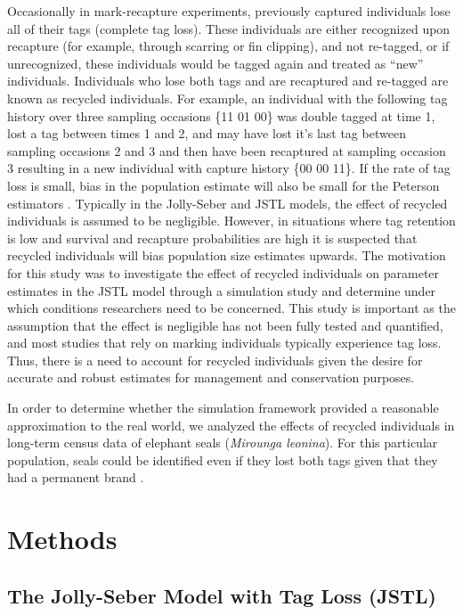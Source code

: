 \documentclass[12pt]{article}
\begin{document}
Occasionally in mark-recapture experiments, previously captured
individuals lose all of their tags (complete tag loss). These
individuals are either recognized upon recapture (for example, through
scarring or fin clipping), and not re-tagged, or if unrecognized, these
individuals would be tagged again and treated as ``new'' individuals.
Individuals who lose both tags and are recaptured and re-tagged are
known as recycled individuals. For example, an individual with the
following tag history over three sampling occasions \{11 01 00\} was
double tagged at time 1, lost a tag between times 1 and 2, and may have
lost it's last tag between sampling occasions 2 and 3 and then have been
recaptured at sampling occasion 3 resulting in a new individual with
capture history \{00 00 11\}. If the rate of tag loss is small, bias in
the population estimate will also be small for the Peterson estimators
\citep{Seber:1981}. Typically in the Jolly-Seber and JSTL models, the
effect of recycled individuals is assumed to be negligible. However, in
situations where tag retention is low and survival and recapture
probabilities are high it is suspected that recycled individuals will
bias population size estimates upwards. The motivation for this study
was to investigate the effect of recycled individuals on parameter
estimates in the JSTL model through a simulation study and determine
under which conditions researchers need to be concerned.  This study is important as the assumption that the effect is negligible has not been fully tested and quantified, and most studies that rely on marking individuals typically experience tag loss. Thus, there is a need to account for recycled individuals given the desire for accurate and robust estimates for management and conservation purposes.

In order to determine whether the simulation framework provided a
reasonable approximation to the real world, we analyzed the effects of
recycled individuals in long-term census data of elephant seals (\textit{Mirounga leonina}). For
this particular population, seals could be identified even if they lost
both tags given that they had a permanent brand \citep{McMahonWhite:2009}.

\section{Methods}\label{methods}

\subsection{The Jolly-Seber Model with Tag Loss
(JSTL)}\label{the-jolly-seber-model-with-tag-loss-jstl}
\end{document}

